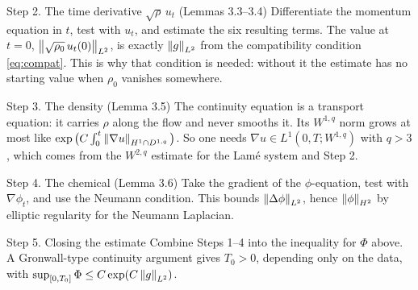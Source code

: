 \begin{step}{\routine{}Step 2. The time derivative $\sqrt\rho\, u_t$ (Lemmas 3.3--3.4)}
Differentiate the momentum equation in $t$, test with $u_t$, and estimate the six resulting terms. The value at $t = 0$, $\left\lVert \sqrt{\rho_0}\,u_t(0)\right\rVert_{L^2}$, is exactly $\left\lVert g\right\rVert_{L^2}$ from the compatibility condition \eqref{eq:compat}. This is why that condition is needed: without it the estimate has no starting value when $\rho_0$ vanishes somewhere.

\end{step}

\begin{step}{\routine{}Step 3. The density (Lemma 3.5)}
The continuity equation is a transport equation: it carries $\rho$ along the flow and never smooths it. Its $W^{1,q}$ norm grows at most like $\exp\big(C\int_0^t \left\lVert \nabla u\right\rVert_{H^1 \cap D^{1,q}}\big)$. So one needs $\nabla u \in L^1(0,T; W^{1,q})$ with $q > 3$, which comes from the $W^{2,q}$ estimate for the Lamé system and Step 2.

\end{step}

\begin{step}{\routine{}Step 4. The chemical (Lemma 3.6)}
Take the gradient of the $\phi$-equation, test with $\nabla\phi_t$, and use the Neumann condition. This bounds $\left\lVert \Delta\phi\right\rVert_{L^2}$, hence $\left\lVert \phi\right\rVert_{H^2}$ by elliptic regularity for the Neumann Laplacian.

\end{step}

\begin{step}{\routine{}Step 5. Closing the estimate}
Combine Steps 1--4 into the inequality for $\Phi$ above. A Gronwall-type continuity argument gives $T_0 > 0$, depending only on the data, with $\sup_{[0,T_0]}\Phi \le C\exp(C\left\lVert g\right\rVert_{L^2})$.

\end{step}

